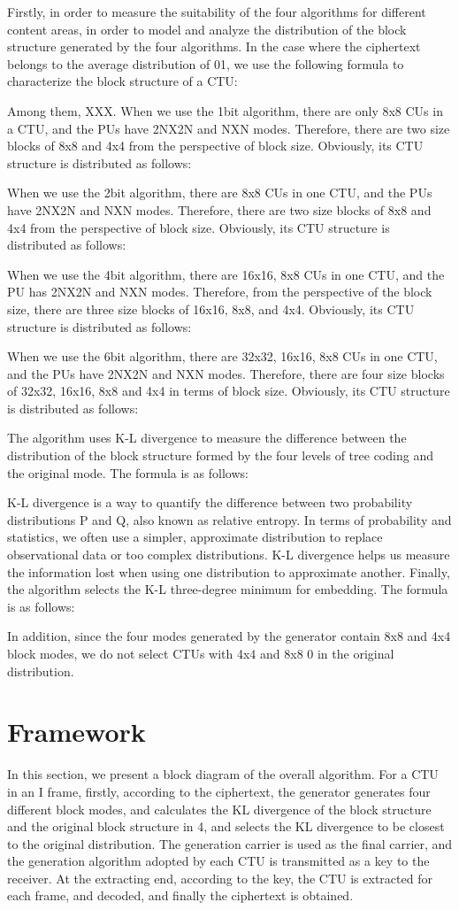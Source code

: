 \documentclass[journal,sort]{IEEEtran}
\begin{document}
Firstly, in order to measure the suitability of the four algorithms for different content areas, in order to model and analyze the distribution of the block structure generated by the four algorithms. In the case where the ciphertext belongs to the average distribution of 01, we use the following formula to characterize the block structure of a CTU:


Among them, XXX. When we use the 1bit algorithm, there are only 8x8 CUs in a CTU, and the PUs have 2NX2N and NXN modes. Therefore, there are two size blocks of 8x8 and 4x4 from the perspective of block size. Obviously, its CTU structure is distributed as follows:

When we use the 2bit algorithm, there are 8x8 CUs in one CTU, and the PUs have 2NX2N and NXN modes. Therefore, there are two size blocks of 8x8 and 4x4 from the perspective of block size. Obviously, its CTU structure is distributed as follows:

When we use the 4bit algorithm, there are 16x16, 8x8 CUs in one CTU, and the PU has 2NX2N and NXN modes. Therefore, from the perspective of the block size, there are three size blocks of 16x16, 8x8, and 4x4. Obviously, its CTU structure is distributed as follows:

When we use the 6bit algorithm, there are 32x32, 16x16, 8x8 CUs in one CTU, and the PUs have 2NX2N and NXN modes. Therefore, there are four size blocks of 32x32, 16x16, 8x8 and 4x4 in terms of block size. Obviously, its CTU structure is distributed as follows:

The algorithm uses K-L divergence to measure the difference between the distribution of the block structure formed by the four levels of tree coding and the original mode. The formula is as follows:

K-L divergence is a way to quantify the difference between two probability distributions P and Q, also known as relative entropy. In terms of probability and statistics, we often use a simpler, approximate distribution to replace observational data or too complex distributions. K-L divergence helps us measure the information lost when using one distribution to approximate another. Finally, the algorithm selects the K-L three-degree minimum for embedding. The formula is as follows:


In addition, since the four modes generated by the generator contain 8x8 and 4x4 block modes, we do not select CTUs with 4x4 and 8x8 0 in the original distribution.
\section{Framework}
In this section, we present a block diagram of the overall algorithm. For a CTU in an I frame, firstly, according to the ciphertext, the generator generates four different block modes, and calculates the KL divergence of the block structure and the original block structure in 4, and selects the KL divergence to be closest to the original distribution. The generation carrier is used as the final carrier, and the generation algorithm adopted by each CTU is transmitted as a key to the receiver. At the extracting end, according to the key, the CTU is extracted for each frame, and decoded, and finally the ciphertext is obtained. 
\end{document}
